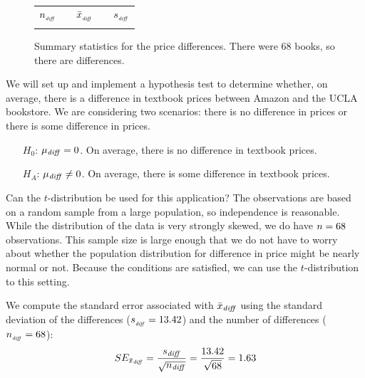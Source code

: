 \begin{figure}[hh]
\centering
\begin{tabular}{ccccc}
\hline
$n_{_{\text{\emph{diff}}}}$	&\hspace{3mm}& $\bar{x}_{_{\text{\emph{diff}}}}$	&\hspace{3mm}& $s_{_{\text{\emph{diff}}}}$ \vspace{1mm}\\
\uclabookN{}  && \uclabookM{}  && \uclabookSD{} \\
\hline
\end{tabular}
\caption{Summary statistics for the price differences.
    There were 68 books, so there are \uclabookN{}
    differences.}
\label{textbooksSummaryStats}
\end{figure}

\D{\newpage}

We will set up and implement a hypothesis test to determine whether, on average, there is a difference in textbook prices between Amazon and the UCLA bookstore.
\label{htForDiffInUCLAAndAmazonTextbookPrices}
We are considering two scenarios: there is no difference in prices or there is some difference in prices.
\begin{itemize}
\setlength{\itemsep}{0mm}
\item[$H_0$:] $\mu_{\text{\emph{diff}}}=0$. On average, there is no difference in textbook prices.
\item[$H_A$:] $\mu_{\text{\emph{diff}}} \neq 0$. On average, there is some difference in textbook prices.
\end{itemize}

Can the $t$-distribution be used for this application?
The observations are based on a random sample from a large population,
so independence is reasonable.
While the distribution of the data is very strongly skewed,
we do have $n = 68{}$ observations.  This sample size is large enough that we do not have to worry about whether the population distribution for difference in price might be nearly normal or not.
Because the conditions are satisfied,
we can use the $t$-distribution to this setting.

We compute the standard error associated with
$\bar{x}_{\text{\emph{diff}}}$ using the standard
deviation of the differences
($s_{_{\text{\emph{diff}}}} = 13.42{}$)
and the number of differences
($n_{_{\text{\emph{diff}}}} = 68{}$):
\begin{align*}
SE_{\bar{x}_{\text{\emph{diff}}}}
  = \frac{s_{\text{\emph{diff}}}}{\sqrt{n_{\text{\emph{diff}}}}}
  = \frac{13.42{}}{\sqrt{68{}}} = 1.63{}
\end{align*}

